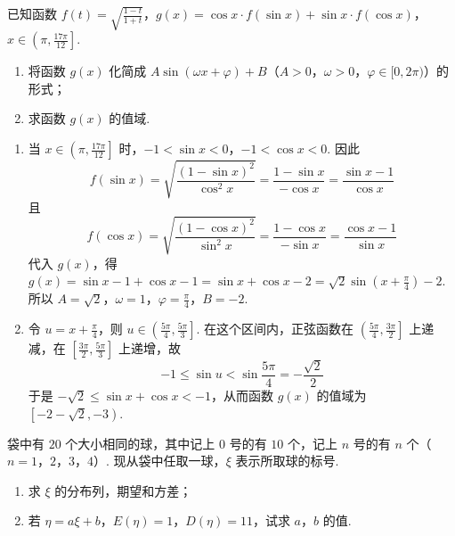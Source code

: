 \begin{problem}
已知函数 \( f(t) = \sqrt{\frac{1 - t}{1 + t}} \)，\( g(x) = \cos x \cdot f(\sin x) + \sin x \cdot f(\cos x) \)，\( x \in \left(\pi, \frac{17\pi}{12}\right] \).
\begin{enumerate}
\item 将函数 \( g(x) \) 化简成 \( A\sin(\omega x + \varphi) + B\)（\(A>0\)，\(\omega>0\)，\(\varphi\in[0,2\pi)\)）的形式；
\item 求函数 \( g(x) \) 的值域.
\end{enumerate}
\end{problem}

\begin{solution}
\begin{enumerate}
\item 当 \(x\in\left(\pi,\frac{17\pi}{12}\right]\) 时，\(-1<\sin x<0\)，\(-1<\cos x<0\). 因此
\[
f(\sin x)=\sqrt{\frac{(1-\sin x)^2}{\cos^2x}}=\frac{1-\sin x}{-\cos x}=\frac{\sin x-1}{\cos x}
\]
且
\[
f(\cos x)=\sqrt{\frac{(1-\cos x)^2}{\sin^2x}}=\frac{1-\cos x}{-\sin x}=\frac{\cos x-1}{\sin x}
\]
代入 \(g(x)\)，得 \(g(x)=\sin x-1+\cos x-1=\sin x+\cos x-2=\sqrt{2}\sin\left(x+\frac{\pi}{4}\right)-2\). 所以 \(A=\sqrt{2}\)，\(\omega=1\)，\(\varphi=\frac{\pi}{4}\)，\(B=-2\).

\item 令 \(u=x+\frac{\pi}{4}\)，则 \(u\in\left(\frac{5\pi}{4},\frac{5\pi}{3}\right]\). 在这个区间内，正弦函数在 \(\left(\frac{5\pi}{4},\frac{3\pi}{2}\right]\) 上递减，在 \(\left[\frac{3\pi}{2},\frac{5\pi}{3}\right]\) 上递增，故
\[
-1\leqslant\sin u<\sin\frac{5\pi}{4}=-\frac{\sqrt{2}}{2}
\]
于是 \(-\sqrt{2}\leqslant\sin x+\cos x<-1\)，从而函数 \(g(x)\) 的值域为 \(\left[-2-\sqrt{2},-3\right)\).
\end{enumerate}
\end{solution}

\begin{problem}
袋中有 \(20\) 个大小相同的球，其中记上 \(0\) 号的有 \(10\) 个，记上 \(n\) 号的有 \(n\) 个（\(n=1\)，\(2\)，\(3\)，\(4\)）. 现从袋中任取一球，\(\xi\) 表示所取球的标号.
\begin{enumerate}
\item 求 \(\xi\) 的分布列，期望和方差；
\item 若 \(\eta = a\xi + b\)，\(E(\eta) = 1\)，\(D(\eta) = 11\)，试求 \(a\)，\(b\) 的值.
\end{enumerate}
\end{problem}

